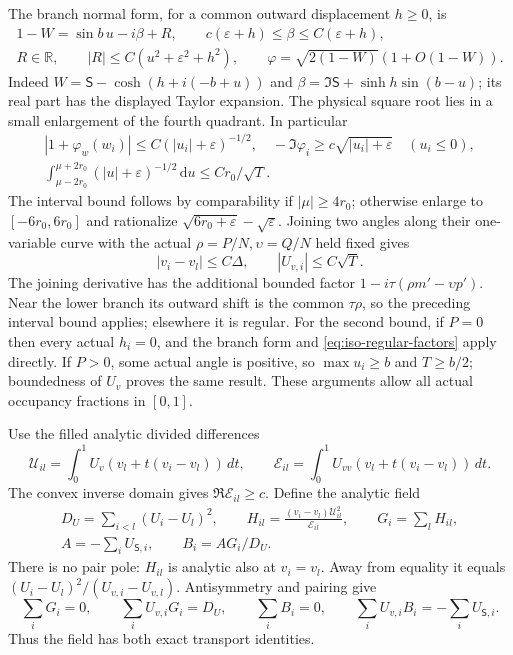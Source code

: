 \documentclass[11pt]{article}
\numberwithin{equation}{section}
\theoremstyle{definition}
\newcommand{\dd}{\,\mathrm d}
\newcommand{\eps}{\varepsilon}
\begin{document}
The branch normal form, for a common outward displacement $h\ge0$,
is
\begin{equation}\label{eq:iso-branch-normal}
 \begin{gathered}
 1-W=\sin b\,u-i\beta+R,\qquad
 c(\eps+h)\le\beta\le C(\eps+h),\\
 R\in\mathbb R,\qquad |R|\le C(u^2+\eps^2+h^2),\qquad
 \varphi=\sqrt{2(1-W)}(1+O(1-W)).
 \end{gathered}
\end{equation}
Indeed $W=\mathsf S-\cosh(h+i(-b+u))$ and
$\beta=\Im\mathsf S+\sinh h\sin(b-u)$; its real part has the
displayed Taylor expansion.  The physical square root lies in a
small enlargement of the fourth quadrant.  In particular
\[
 \begin{gathered}
 |1+\varphi_w(w_i)|\le C(|u_i|+\eps)^{-1/2},\quad
 -\Im\varphi_i\ge c\sqrt{|u_i|+\eps}\quad(u_i\le0),\\
 \int_{\mu-2r_0}^{\mu+2r_0}(|u|+\eps)^{-1/2}\dd u
       \le Cr_0/\sqrt T.
 \end{gathered}
\]
The interval bound follows by comparability if $|\mu|\ge4r_0$;
otherwise enlarge to $[-6r_0,6r_0]$ and rationalize
$\sqrt{6r_0+\eps}-\sqrt\eps$.
Joining two angles along their one-variable curve with the actual
$\rho=P/N,\upsilon=Q/N$ held fixed gives
\begin{equation}\label{eq:iso-coordinate-scales}
 |v_i-v_l|\le C\Delta,\qquad |U_{v,i}|\le C\sqrt T.
\end{equation}
The joining derivative has the additional bounded factor
$1-i\tau(\rho m'-\upsilon p')$.  Near the lower branch its outward
shift is the common $\tau\rho$, so the preceding interval bound
applies; elsewhere it is regular.  For the second bound, if $P=0$
then every actual $h_i=0$, and the branch form and
\eqref{eq:iso-regular-factors} apply directly.  If $P>0$, some
actual angle is positive, so $\max u_i\ge b$ and $T\ge b/2$;
boundedness of $U_v$ proves the same result.  These arguments allow
all actual occupancy fractions in $[0,1]$.

Use the filled analytic divided differences
\[
 \mathcal U_{il}=\int_0^1U_v(v_l+t(v_i-v_l))\,dt,\qquad
 \mathcal E_{il}=\int_0^1U_{vv}(v_l+t(v_i-v_l))\,dt.
\]
The convex inverse domain gives $\Re\mathcal E_{il}\ge c$.
Define the analytic field
\begin{equation}\label{eq:iso-covariance-field}
 \begin{gathered}
 D_U=\sum_{i<l}(U_i-U_l)^2,\qquad
 H_{il}=\frac{(v_i-v_l)\mathcal U_{il}^2}{\mathcal E_{il}},
 \qquad G_i=\sum_lH_{il},\\
 A=-\sum_iU_{\mathsf S,i},\qquad B_i=AG_i/D_U.
 \end{gathered}
\end{equation}
There is no pair pole: $H_{il}$ is analytic also at $v_i=v_l$.
Away from equality it equals $(U_i-U_l)^2/(U_{v,i}-U_{v,l})$.
Antisymmetry and pairing give
\[
 \sum_iG_i=0,\qquad \sum_iU_{v,i}G_i=D_U,\qquad
 \sum_iB_i=0,\qquad \sum_iU_{v,i}B_i=-\sum_iU_{\mathsf S,i}.
\]
Thus the field has both exact transport identities.
\end{document}
